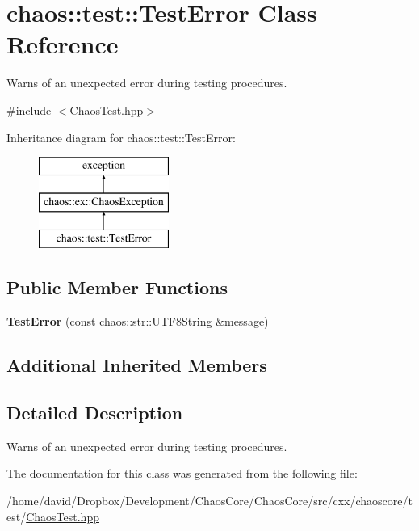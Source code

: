 \hypertarget{classchaos_1_1test_1_1_test_error}{\section{chaos\-:\-:test\-:\-:Test\-Error Class Reference}
\label{classchaos_1_1test_1_1_test_error}
}


Warns of an unexpected error during testing procedures.  




{\ttfamily \#include $<$Chaos\-Test.\-hpp$>$}

Inheritance diagram for chaos\-:\-:test\-:\-:Test\-Error\-:\begin{figure}[H]
\begin{center}
\leavevmode
\includegraphics[height=3.000000cm]{classchaos_1_1test_1_1_test_error}
\end{center}
\end{figure}
\subsection*{Public Member Functions}
\begin{DoxyCompactItemize}
\item 
\hypertarget{classchaos_1_1test_1_1_test_error_aea55ce1371395d0790bf064888de8ee3}{{\bfseries Test\-Error} (const \hyperlink{classchaos_1_1str_1_1_u_t_f8_string}{chaos\-::str\-::\-U\-T\-F8\-String} \&message)}\label{classchaos_1_1test_1_1_test_error_aea55ce1371395d0790bf064888de8ee3}

\end{DoxyCompactItemize}
\subsection*{Additional Inherited Members}


\subsection{Detailed Description}
Warns of an unexpected error during testing procedures. 

The documentation for this class was generated from the following file\-:\begin{DoxyCompactItemize}
\item 
/home/david/\-Dropbox/\-Development/\-Chaos\-Core/\-Chaos\-Core/src/cxx/chaoscore/test/\hyperlink{_chaos_test_8hpp}{Chaos\-Test.\-hpp}\end{DoxyCompactItemize}
